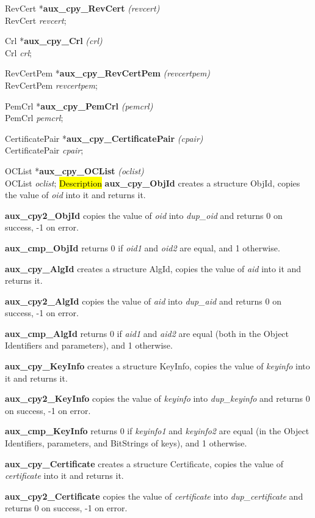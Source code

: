 RevCert *{\bf aux\_cpy\_RevCert} {\em  (revcert)} \\
RevCert {\em *revcert};

Crl *{\bf aux\_cpy\_Crl} {\em  (crl)} \\
Crl {\em *crl};

RevCertPem *{\bf aux\_cpy\_RevCertPem} {\em  (revcertpem)} \\
RevCertPem {\em *revcertpem};

PemCrl *{\bf aux\_cpy\_PemCrl} {\em  (pemcrl)} \\
PemCrl {\em *pemcrl};

CertificatePair *{\bf aux\_cpy\_CertificatePair} {\em  (cpair)} \\
CertificatePair {\em *cpair};

OCList *{\bf aux\_cpy\_OCList} {\em  (oclist)} \\
OCList {\em *oclist};
\hl{Description}
{\bf aux\_cpy\_ObjId} creates a structure ObjId, copies the value
of {\em oid} into it and returns it.
                   
{\bf aux\_cpy2\_ObjId} copies the value of {\em oid} into {\em dup\_oid}
and returns 0 on success, -1 on error.

{\bf aux\_cmp\_ObjId} returns 0 if {\em oid1} and {\em oid2} are equal,
and 1 otherwise.

{\bf aux\_cpy\_AlgId} creates a structure AlgId, copies the value
of {\em aid} into it and returns it.

{\bf aux\_cpy2\_AlgId} copies the value of {\em aid} into {\em dup\_aid}
and returns 0 on success, -1 on error.

{\bf aux\_cmp\_AlgId} returns 0 if {\em aid1} and {\em aid2} are equal
(both in the Object Identifiers and parameters),
and 1 otherwise.

{\bf aux\_cpy\_KeyInfo} creates a structure KeyInfo, copies the value
of {\em keyinfo} into it and returns it.

{\bf aux\_cpy2\_KeyInfo} copies the value of {\em keyinfo} into {\em dup\_keyinfo}
and returns 0 on success, -1 on error.

{\bf aux\_cmp\_KeyInfo} returns 0
if {\em keyinfo1} and {\em keyinfo2} are equal
(in the Object Identifiers, parameters, and BitStrings of keys),
and 1 otherwise.

{\bf aux\_cpy\_Certificate} creates a structure Certificate, copies the value
of {\em certificate} into it and returns it.

{\bf aux\_cpy2\_Certificate} copies the value of {\em certificate} into {\em dup\_certificate}
and returns 0 on success, -1 on error.

